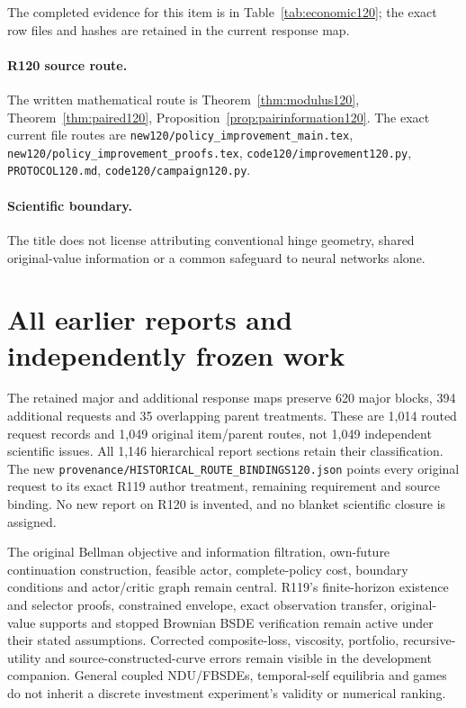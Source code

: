 The completed evidence for this item is in Table~\ref{tab:economic120}; the exact row files and hashes are retained in the current response map.
\paragraph{R120 source route.}
The written mathematical route is Theorem~\ref{thm:modulus120}, Theorem~\ref{thm:paired120}, Proposition~\ref{prop:pairinformation120}. The exact current file routes are \nolinkurl{new120/policy_improvement_main.tex}, \nolinkurl{new120/policy_improvement_proofs.tex}, \nolinkurl{code120/improvement120.py}, \nolinkurl{PROTOCOL120.md}, \nolinkurl{code120/campaign120.py}.
\paragraph{Scientific boundary.}
The title does not license attributing conventional hinge geometry, shared original-value information or a common safeguard to neural networks alone.
\section{All earlier reports and independently frozen work}
The retained major and additional response maps preserve 620 major blocks,
394 additional requests and 35 overlapping parent treatments. These are
1,014 routed request records and 1,049 original item/parent routes, not
1,049 independent scientific issues. All 1,146 hierarchical report sections
retain their classification. The new
\nolinkurl{provenance/HISTORICAL_ROUTE_BINDINGS120.json}
points every original request to its exact R119 author treatment, remaining
requirement and source binding. No new report on R120 is invented, and no
blanket scientific closure is assigned.

The original Bellman objective and information filtration, own-future
continuation construction, feasible actor, complete-policy cost, boundary
conditions and actor/critic graph remain central. R119's finite-horizon
existence and selector proofs, constrained envelope, exact observation
transfer, original-value supports and stopped Brownian BSDE verification
remain active under their stated assumptions. Corrected composite-loss,
viscosity, portfolio, recursive-utility and source-constructed-curve errors
remain visible in the development companion. General coupled NDU/FBSDEs,
temporal-self equilibria and games do not inherit a discrete investment
experiment's validity or numerical ranking.

